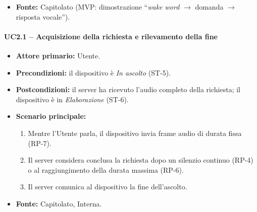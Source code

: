 \documentclass[12pt,a4paper]{article}
\newcommand{\tightlist}{\setlength{\itemsep}{1pt}\setlength{\parskip}{0pt}}
\begin{document}
\begin{itemize}
\begin{itemize}
\tightlist

\item al passo 2, nessun parlato entro il tempo di attesa: UC3;

\item al passo 4, trascrizione vuota o non riconoscibile: UC4;

\item ai passi 4--6, servizio non raggiungibile o in errore: UC7;

\item al passo 5, il modello sceglie lo strumento di una \emph{skill}: UC10; più strumenti in sequenza: UC11; uno strumento MCP: UC12.

\end{itemize}

\item \textbf{Fonte:} Capitolato (MVP: dimostrazione ``\emph{wake word} $\rightarrow$ domanda $\rightarrow$ risposta vocale'').

\end{itemize}



\paragraph{UC2.1 -- Acquisizione della richiesta e rilevamento della fine}

\begin{itemize}

\tightlist

\item \textbf{Attore primario:} Utente.

\item \textbf{Precondizioni:} il dispositivo è \emph{In ascolto} (ST-5).

\item \textbf{Postcondizioni:} il server ha ricevuto l'audio completo della richiesta; il dispositivo è in \emph{Elaborazione} (ST-6).

\item \textbf{Scenario principale:}

\begin{enumerate}

\tightlist

\item Mentre l'Utente parla, il dispositivo invia frame audio di durata fissa (RP-7).

\item Il server considera conclusa la richiesta dopo un silenzio continuo (RP-4) o al raggiungimento della durata massima (RP-6).

\item Il server comunica al dispositivo la fine dell'ascolto.

\end{enumerate}

\item \textbf{Fonte:} Capitolato, Interna.

\end{itemize}
\end{document}

